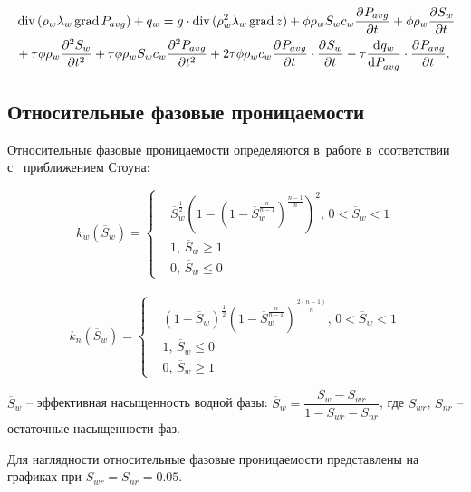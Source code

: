 \begin{equation} \label{eq:mod_saturation}
 \begin{aligned}
  & \diver{ (\rho_w\lambda_w \grad{ P_{avg}})} + q_w = g \cdot \diver{ (\rho_w^2\lambda_w \grad{ z})} + \phi \rho_w S_w c_w  \pd{P_{avg}}{t}
  + \phi \rho_w \pd{S_w}{t} \\
  & + \tau \phi \rho_w \pd[2]{S_w}{t} + \tau \phi \rho_w S_w c_w \pd[2]{P_{avg}}{t}
  + 2 \tau \phi \rho_w c_w \pd{P_{avg}}{t} \cdot \pd{S_w}{t} - \tau \dd{q_w}{P_{avg}} \cdot \pd{P_{avg}}{t}.
 \end{aligned}
\end{equation}

\subsection{Относительные фазовые проницаемости}
Относительные фазовые проницаемости определяются в~работе в~соответствии с~
приближением Стоуна\cite{Aziz-Settari}:

\begin{equation*}
  k_{w}(\overline{S}_w)=
  \begin{cases}
  &\overline{S}_w^\frac{1}{2} \left( 1-\left( 1-\overline{S}_w^\frac{n}{n-1} \right) ^\frac{n-1}{n} \right) ^2,
  \, 0<\overline{S}_w<1 \\
  &1, \,\overline{S}_w\ge 1\\
  &0, \,\overline{S}_w\le 0
\end{cases} 
\end{equation*}
\\
\begin{equation*}
  k_{n}(\overline{S}_w)=
  \begin{cases}
  &(1-\overline{S}_w)^\frac{1}{2} \left(1-\overline{S}_w^\frac{n}{n-1} \right) ^\frac{2(n-1)}{n},
  \, 0<\overline{S}_w<1\\
  &1, \,\overline{S}_w\le 0\\
  &0, \, \overline{S}_w\ge 1
  \end{cases}
\end{equation*}

$\overline{S}_w$ -- эффективная насыщенность водной фазы:
$\overline{S}_w={\dfrac{S_w-S_{wr}}{1-S_{wr}-S_{nr}}}$, где $S_{wr}$,
$S_{nr}$ -- остаточные насыщенности фаз.

Для наглядности относительные фазовые проницаемости представлены на графиках при $S_{wr}=S_{nr}=0.05$.


